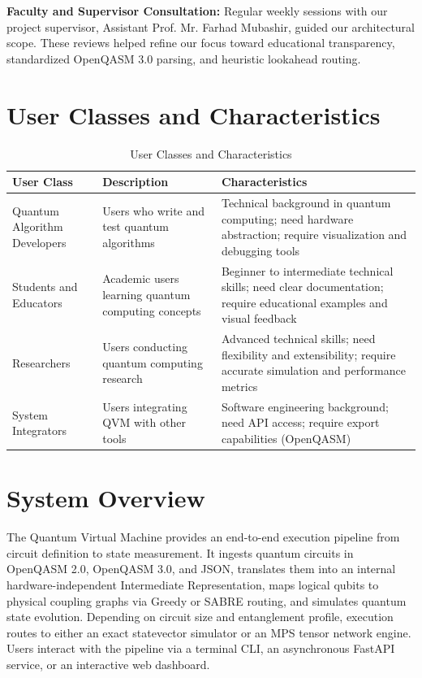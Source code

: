 \textbf{Faculty and Supervisor Consultation:} Regular weekly sessions with our project supervisor, Assistant Prof. Mr. Farhad Mubashir, guided our architectural scope. These reviews helped refine our focus toward educational transparency, standardized OpenQASM 3.0 parsing, and heuristic lookahead routing.

\section{User Classes and Characteristics}

\begin{table}[H]
\centering
\caption{User Classes and Characteristics}
\begin{tabular}{|p{3cm}|p{5cm}|p{5cm}|}
\hline
\textbf{User Class} & \textbf{Description} & \textbf{Characteristics} \\
\hline
Quantum Algorithm Developers & Users who write and test quantum algorithms & Technical background in quantum computing; need hardware abstraction; require visualization and debugging tools \\
\hline
Students and Educators & Academic users learning quantum computing concepts & Beginner to intermediate technical skills; need clear documentation; require educational examples and visual feedback \\
\hline
Researchers & Users conducting quantum computing research & Advanced technical skills; need flexibility and extensibility; require accurate simulation and performance metrics \\
\hline
System Integrators & Users integrating QVM with other tools & Software engineering background; need API access; require export capabilities (OpenQASM) \\
\hline
\end{tabular}
\end{table}

\section{System Overview}
The Quantum Virtual Machine provides an end-to-end execution pipeline from circuit definition to state measurement. It ingests quantum circuits in OpenQASM 2.0, OpenQASM 3.0, and JSON, translates them into an internal hardware-independent Intermediate Representation, maps logical qubits to physical coupling graphs via Greedy or SABRE routing, and simulates quantum state evolution. Depending on circuit size and entanglement profile, execution routes to either an exact statevector simulator or an MPS tensor network engine. Users interact with the pipeline via a terminal CLI, an asynchronous FastAPI service, or an interactive web dashboard.

